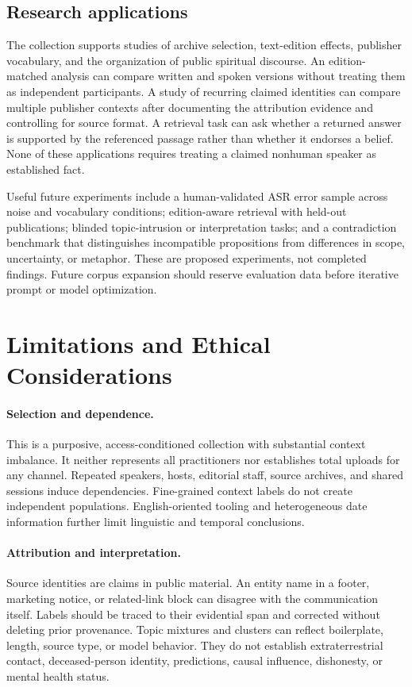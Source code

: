 \subsection{Research applications}
The collection supports studies of archive selection, text-edition effects, publisher vocabulary, and the organization of public spiritual discourse. An edition-matched analysis can compare written and spoken versions without treating them as independent participants. A study of recurring claimed identities can compare multiple publisher contexts after documenting the attribution evidence and controlling for source format. A retrieval task can ask whether a returned answer is supported by the referenced passage rather than whether it endorses a belief. None of these applications requires treating a claimed nonhuman speaker as established fact.

Useful future experiments include a human-validated ASR error sample across noise and vocabulary conditions; edition-aware retrieval with held-out publications; blinded topic-intrusion or interpretation tasks; and a contradiction benchmark that distinguishes incompatible propositions from differences in scope, uncertainty, or metaphor. These are proposed experiments, not completed findings. Future corpus expansion should reserve evaluation data before iterative prompt or model optimization.

\section{Limitations and Ethical Considerations}
\paragraph{Selection and dependence.}
This is a purposive, access-conditioned collection with substantial context imbalance. It neither represents all practitioners nor establishes total uploads for any channel. Repeated speakers, hosts, editorial staff, source archives, and shared sessions induce dependencies. Fine-grained context labels do not create independent populations. English-oriented tooling and heterogeneous date information further limit linguistic and temporal conclusions.

\paragraph{Attribution and interpretation.}
Source identities are claims in public material. An entity name in a footer, marketing notice, or related-link block can disagree with the communication itself. Labels should be traced to their evidential span and corrected without deleting prior provenance. Topic mixtures and clusters can reflect boilerplate, length, source type, or model behavior. They do not establish extraterrestrial contact, deceased-person identity, predictions, causal influence, dishonesty, or mental health status.

